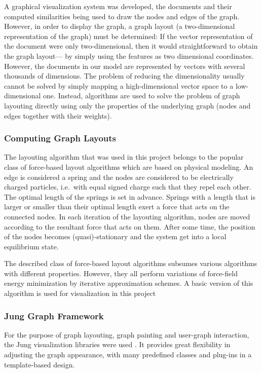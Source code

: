 A graphical visualization system was developed, the documents and their computed similarities being used to draw the nodes and edges of the graph.
However, in order to display the graph, a graph layout (a two-dimensional representation of the
graph) must be determined: If the vector representation of the document were only two-dimensional,
then it would straightforward to obtain the graph layout--- by simply using the features as two dimensional
coordinates. However, the documents in our model are represented by vectors with several thousands
of dimensions. The problem of reducing the dimensionality usually cannot be solved by simply mapping a high-dimensional vector space to a low-dimensional one. Instead, algorithms are used to solve the problem of graph layouting directly using only the properties of the underlying graph
(nodes and edges together with their weights).

\subsubsection{Computing Graph Layouts}
The layouting algorithm that was used in this project belongs to the popular class of force-based
layout algorithms which are based on physical modeling. An edge is considered a spring and
the nodes are considered to be electrically charged particles, i.e.\ with equal signed charge such
that they repel each other. The optimal length of the springs is set in advance. Springs with a 
length that is larger or smaller than their optimal length exert a force that acts on the connected
nodes. In each iteration of the layouting algorithm, nodes are moved according to the resultant
force
that acts on them. After some time, the position of the nodes becomes (quasi)-stationary and the
system get into a local equilibrium state.

The described class of force-based layout algorithms subsumes various algorithms with different
properties. However, they all perform variations of force-field energy minimization by iterative
approximation schemes. A basic version of this algorithm is used for visualization in this project

\subsubsection{Jung Graph Framework}
For the purpose of graph layouting, graph painting and user-graph interaction, the
Jung visualization libraries were used \cite{jung}. It provides great
flexibility in adjusting the graph appearance, with many predefined classes and plug-ins in a template-based design.

